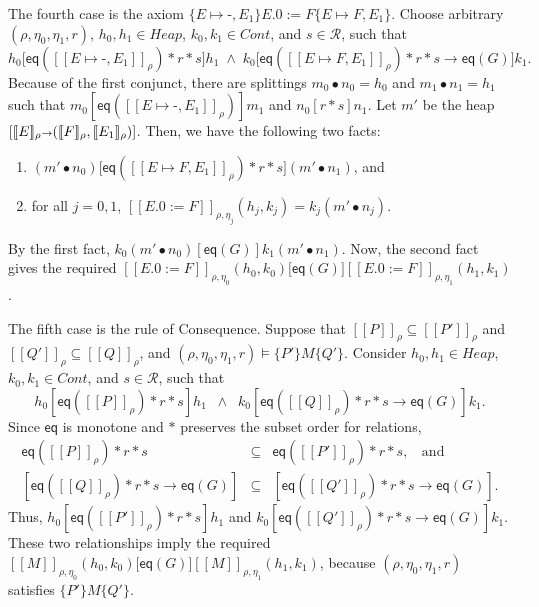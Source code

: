 \documentclass{LMCS}
\newcommand{\blank}{\mbox{-}}
\newcommand{\pointsto}{\mapsto}
\newcommand{\Heap}{\mathit{Heap}}
\newcommand{\Good}{\mathit{G}}
\newcommand{\cR}{\mathcal{R}}
\newcommand{\cont}{\mathit{Cont}}
\newcommand{\bind}{{\scriptstyle\relax\rightarrow}}
\newcommand{\ff}[1]{[\![#1]\!]}
\newcommand{\mtri}[3]{\{{#1}\}{#2}\{{#3}\}}
\newcommand{\EQ}{\mathsf{eq}}
\begin{document}
The fourth case is the axiom
$\mtri{E\pointsto \blank,E_1}{E.0:=F}{E \pointsto F,E_1}$.
Choose arbitrary $(\rho,\eta_0,\eta_1,r)$,
$h_0,h_1 \in \Heap$, $k_0,k_1 \in \cont$, and
$s \in\cR$, such that
$$
   h_0\bigl[\EQ(\ff{E\pointsto \blank,E_1}_\rho) * r * s\bigr]h_1
   \;\wedge\;
   k_0\bigl[\EQ(\ff{E\pointsto F,E_1}_\rho) * r * s 
            \rightarrow \EQ(\Good)\bigr]k_1.
$$
Because of the first conjunct, there
are splittings $m_0\bullet n_0 = h_0$ and 
$m_1 \bullet n_1 = h_1$ such that 
$m_0[\EQ(\ff{E \pointsto \blank,E_1}_\rho)]m_1$ and $n_0[r*s]n_1$.
Let $m'$ be the heap
$[\ff{E}_\rho \bind (\ff{F}_\rho,\ff{E_1}_\rho)]$. 
Then, we have the following two facts:
\begin{enumerate}
\item $(m' \bullet n_0) \bigl[\EQ(\ff{E\pointsto F,E_1}_\rho)*r*s\bigr] (m' \bullet n_1)$, and
\item for all $j = 0,1$, 
$\ff{E.0 := F}_{\rho,\eta_j}(h_j,k_j) 
  =
 k_j
 (m' \bullet n_j)$.
\end{enumerate}
By the first fact, $k_0(m'\bullet n_0)[\EQ(\Good)]k_1(m'\bullet n_1)$.
Now, the second fact gives the required
$\ff{E.0 := F}_{\rho,\eta_0}(h_0,k_0)\bigl[\EQ(\Good)\bigr]  
  \ff{E.0 := F}_{\rho,\eta_1}(h_1,k_1)$.

The fifth case is the rule of Consequence. Suppose
that $\ff{P}_\rho \subseteq \ff{P'}_\rho$ and
$\ff{Q'}_\rho \subseteq \ff{Q}_\rho$, and
$(\rho,\eta_0,\eta_1,r) \models \mtri{P'}{M}{Q'}$.
Consider
$h_0,h_1 \in \Heap$, $k_0,k_1 \in \cont$, and $s \in\cR$, such that
$$
  h_0[\EQ(\ff{P}_\rho)*r*s]h_1\;\;\wedge\;\;
  k_0[\EQ(\ff{Q}_\rho)*r*s \rightarrow \EQ(\Good)]k_1.
$$
Since $\EQ$ is monotone and $*$ preserves the subset order for
relations, 
$$
\begin{array}{rcl}
  \EQ(\ff{P}_\rho)*r*s & \subseteq &
  \EQ(\ff{P'}_\rho)*r*s, \;\;\mbox{ and}
\\
  {[\EQ(\ff{Q}_\rho)*r*s \rightarrow \EQ(\Good)]} & \subseteq &
  {[\EQ(\ff{Q'}_\rho)*r*s \rightarrow \EQ(\Good)]}.
\end{array}
$$
Thus, $h_0[\EQ(\ff{P'}_\rho)*r*s]h_1$ and
$k_0[\EQ(\ff{Q'}_\rho)*r*s \rightarrow \EQ(\Good)]k_1$.
These two relationships imply the required 
$\ff{M}_{\rho,\eta_0}(h_0,k_0)\bigl[\EQ(\Good)\bigr]
 \ff{M}_{\rho,\eta_1}(h_1,k_1)$, because
 $(\rho,\eta_0,\eta_1,r)$ satisfies $\mtri{P'}{M}{Q'}$.
\end{document}
